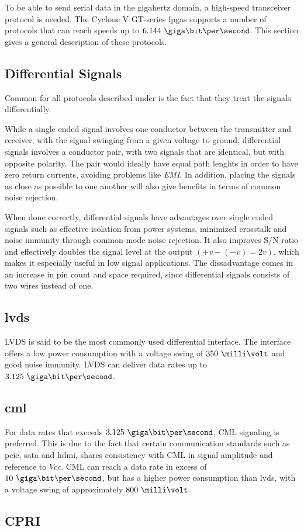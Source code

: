 \documentclass[main.tex]{subfiles}
\begin{document}
To be able to send serial data in the gigahertz domain, a high-speed transceiver protocol is needed. The Cyclone V GT-series \glspl{fpga} supports a number of protocols that can reach speeds up to $6.144\ \giga\bit\per\second$. This section gives a general description of these protocols.

\subsection{Differential Signals} \label{subsec:diffsig}

Common for all protocols described under is the fact that they treat the signals differentially. 

While a single ended signal involves one conductor between the transmitter and receiver, with the signal swinging from a given voltage to ground, differential signals involves a conductor pair, with two signals that are identical, but with opposite polarity. The pair would ideally have equal path lenghts in order to have zero return currents, avoiding problems like \textit{EMI}. In addition, placing the signals as close as possible to one another will also give benefits in terms of common noise rejection.\cite{douglas01}

When done correctly, differential signals have advantages over single ended signals such as effective isolation from power systems, minimized crosstalk and noise immunity through common-mode noise rejection. It also improves S/N ratio and effectively doubles the signal level at the output $(+v - (-v) = 2v)$, which makes it especially useful in low signal applications. The dissadvantage comes in an increase in pin count and space required, since differential signals consists of two wires instead of one.

\subsection{\gls{lvds}}

LVDS is said to be the most commonly used differential interface. The interface offers a low power consumption with a voltage swing of $350\ \milli\volt$ and good noise immunity. LVDS can deliver data rates up to $3.125\ \giga\bit\per\second$. \cite{ti08lvds}

\subsection{\gls{cml}}

For data rates that exceeds $3.125\ \giga\bit\per\second$, CML signaling is preferred. This is due to the fact that certain communication standards such as \acrshort{pcie}, \acrshort{sata} and \acrshort{hdmi}, shares consistency with CML in signal amplitude and reference to $Vcc$. CML can reach a data rate in excess of $10\ \giga\bit\per\second$, but has a higher power consumption than \gls{lvds}, with a voltage swing of approximately $800\ \milli\volt$. \cite{ti08lvds}

\subsection{CPRI}



\end{document}
